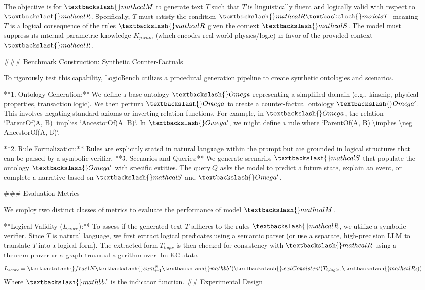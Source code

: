 \documentclass{article}
\begin{document}
The objective is for $\textbackslash{}mathcal{M}$ to generate text $T$ such that $T$ is linguistically fluent and logically valid with respect to $\textbackslash{}mathcal{R}$. Specifically, $T$ must satisfy the condition $\textbackslash{}mathcal{R} \textbackslash{}models T$, meaning $T$ is a logical consequence of the rules $\textbackslash{}mathcal{R}$ given the context $\textbackslash{}mathcal{S}$. The model must suppress its internal parametric knowledge $K_{param}$ (which encodes real-world physics/logic) in favor of the provided context $\textbackslash{}mathcal{R}$.

\#\#\# Benchmark Construction: Synthetic Counter-Factuals

To rigorously test this capability, LogicBench utilizes a procedural generation pipeline to create synthetic ontologies and scenarios.

**1. Ontology Generation:**
We define a base ontology $\textbackslash{}Omega$ representing a simplified domain (e.g., kinship, physical properties, transaction logic).  We then perturb $\textbackslash{}Omega$ to create a counter-factual ontology $\textbackslash{}Omega'$. This involves negating standard axioms or inverting relation functions. For example, in $\textbackslash{}Omega$, the relation `ParentOf(A, B)` implies `AncestorOf(A, B)`. In $\textbackslash{}Omega'$, we might define a rule where `ParentOf(A, B) \textbackslash{}implies \textbackslash{}neg AncestorOf(A, B)`.

**2. Rule Formalization:**
Rules are explicitly stated in natural language within the prompt but are grounded in logical structures that can be parsed by a symbolic verifier. **3. Scenarios and Queries:**
We generate scenarios $\textbackslash{}mathcal{S}$ that populate the ontology $\textbackslash{}Omega'$ with specific entities. The query $Q$ asks the model to predict a future state, explain an event, or complete a narrative based on $\textbackslash{}mathcal{S}$ and $\textbackslash{}Omega'$.

\#\#\# Evaluation Metrics

We employ two distinct classes of metrics to evaluate the performance of model $\textbackslash{}mathcal{M}$.

**Logical Validity ($L_{score}$):**
To assess if the generated text $T$ adheres to the rules $\textbackslash{}mathcal{R}$, we utilize a symbolic verifier. Since $T$ is natural language, we first extract logical predicates using a semantic parser (or use a separate, high-precision LLM to translate $T$ into a logical form). The extracted form $T_{logic}$ is then checked for consistency with $\textbackslash{}mathcal{R}$ using a theorem prover or a graph traversal algorithm over the KG state.
$$ L_{score} = \textbackslash{}frac{1}{N} \textbackslash{}sum_{i=1}^{N} \textbackslash{}mathbb{I}(\textbackslash{}text{Consistent}(T_{i, logic}, \textbackslash{}mathcal{R}_i)) $$
Where $\textbackslash{}mathbb{I}$ is the indicator function. \#\# Experimental Design
\end{document}
